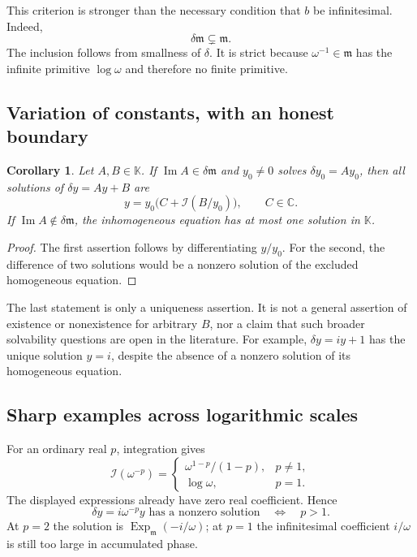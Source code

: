\documentclass[11pt,letterpaper]{article}
\numberwithin{equation}{section}
\newtheorem{corollary}[theorem]{Corollary}
\theoremstyle{definition}
\theoremstyle{remark}
\newcommand{\K}{\mathbb K}
\newcommand{\C}{\mathbb C}
\newcommand{\mm}{\mathfrak m}
\newcommand{\im}{\operatorname{Im}}
\newcommand{\Ex}{\operatorname{Exp}_{\mm}}
\newcommand{\Iop}{\mathcal I}
\begin{document}
This criterion is stronger than the necessary condition that $b$ be infinitesimal. Indeed,
\begin{equation}\label{eq:proper}
 \delta\mm\subsetneq\mm.
\end{equation}
The inclusion follows from smallness of $\delta$. It is strict because $\omega^{-1}\in\mm$ has the infinite primitive $\log\omega$ and therefore no finite primitive.

\subsection{Variation of constants, with an honest boundary}
\begin{corollary}\label{cor:inhom}
Let $A,B\in\K$. If $\im A\in\delta\mm$ and $y_0\ne0$ solves $\delta y_0=Ay_0$, then all solutions of $\delta y=Ay+B$ are
\begin{equation}\label{eq:varconstants}
 y=y_0\bigl(C+\Iop(B/y_0)\bigr),\qquad C\in\C.
\end{equation}
If $\im A\notin\delta\mm$, the inhomogeneous equation has at most one solution in $\K$.
\end{corollary}
\begin{proof}
The first assertion follows by differentiating $y/y_0$. For the second, the difference of two solutions would be a nonzero solution of the excluded homogeneous equation.
\end{proof}
The last statement is only a uniqueness assertion. It is not a general assertion of existence or nonexistence for arbitrary $B$, nor a claim that such broader solvability questions are open in the literature. For example, $\delta y=iy+1$ has the unique solution $y=i$, despite the absence of a nonzero solution of its homogeneous equation.

\subsection{Sharp examples across logarithmic scales}
For an ordinary real $p$, integration gives
\[
 \Iop(\omega^{-p})=
 \begin{cases}
 \omega^{1-p}/(1-p),&p\ne1,\\
 \log\omega,&p=1.
 \end{cases}
\]
The displayed expressions already have zero real coefficient. Hence
\begin{equation}\label{eq:powerthreshold}
 \delta y=i\omega^{-p}y\text{ has a nonzero solution}
 \quad\Longleftrightarrow\quad p>1.
\end{equation}
At $p=2$ the solution is $\Ex(-i/\omega)$; at $p=1$ the infinitesimal coefficient $i/\omega$ is still too large in accumulated phase.
\end{document}
